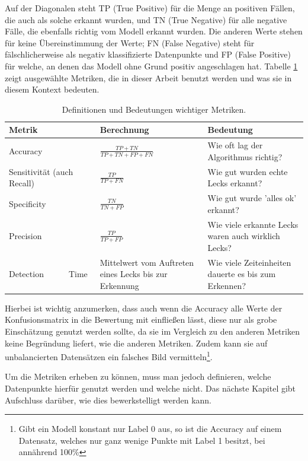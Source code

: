 Auf der Diagonalen steht TP (True Positive) für die Menge an positiven Fällen, die auch als solche erkannt
 wurden, und TN (True Negative) für alle negative Fälle, die ebenfalls richtig vom Modell erkannt wurden.
 Die anderen Werte stehen für keine Übereinstimmung der Werte; FN (False Negative) steht für fälschlicherweise
 als negativ klassifizierte Datenpunkte und FP (False Positive) für welche, an denen das Modell ohne Grund
 positiv angeschlagen hat. Tabelle \ref{tab:theory-metrics} zeigt ausgewählte Metriken, die in dieser Arbeit benutzt werden und was sie
 in diesem Kontext bedeuten.

\renewcommand{\arraystretch}{1.5}
\begin{table}
    \begin{tabular}{ m{6em} m{9em} m{14em} }
        Metrik & Berechnung & Bedeutung \\
        \hline
        Accuracy              & $\frac{TP+TN}{TP+TN+FP+FN}$ & Wie oft lag der Algorithmus richtig? \\
        Sensitivität (auch Recall) & $\frac{TP}{TP+FN}$          & Wie gut wurden echte Lecks erkannt? \\
        Specificity           & $\frac{TN}{TN+FP}$          & Wie gut wurde 'alles ok' erkannt? \\
        Precision             & $\frac{TP}{TP+FP}$          & Wie viele erkannte Lecks waren auch wirklich Lecks? \\
        Detection\ \ \ \ \ \ Time & Mittelwert vom Auftreten eines Lecks bis zur Erkennung & Wie viele Zeiteinheiten dauerte es bis zum Erkennen?
    \end{tabular}
    \caption{Definitionen und Bedeutungen wichtiger Metriken.}
    \label{tab:theory-metrics}
\end{table}

Hierbei ist wichtig anzumerken, dass auch wenn die Accuracy alle Werte der Konfusionsmatrix in die Bewertung
 mit einfließen lässt, diese nur als grobe Einschätzung genutzt werden sollte, da sie im Vergleich zu den anderen
 Metriken keine Begründung liefert, wie die anderen Metriken. Zudem kann sie auf unbalancierten Datensätzen ein
 falsches Bild vermitteln\footnote{Gibt ein Modell konstant nur Label 0 aus, so ist die Accuracy auf einem
 Datensatz, welches nur ganz wenige Punkte mit Label 1 besitzt, bei annährend 100\%}.

Um die Metriken erheben zu können, muss man jedoch definieren, welche Datenpunkte hierfür genutzt werden
 und welche nicht. Das nächste Kapitel gibt Aufschluss darüber, wie dies bewerkstelligt werden kann.


